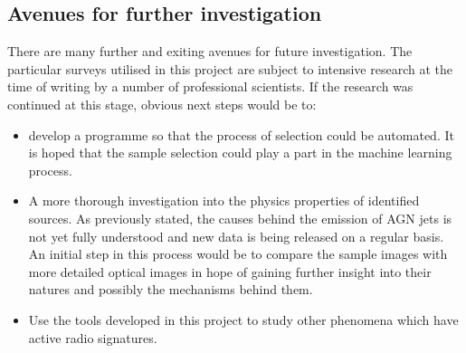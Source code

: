 \documentclass{article}
\begin{document}
\subsection{Avenues for further investigation}
There are many further and exiting avenues for future investigation. The particular surveys utilised in this project are subject to intensive research at the time of writing by a number of professional scientists. If the research was continued at this stage, obvious next steps would be to:
\begin{itemize}
    \item develop a programme so that the process of selection could be automated. It is hoped that the sample selection could play a part in the machine learning process.
    \item A more thorough investigation into the physics properties of identified sources. As previously stated, the causes behind the emission of AGN jets is not yet fully understood and new data is being released on a regular basis. An initial step in this process would be to compare the sample images with more detailed optical images in hope of gaining further insight into their natures and possibly the mechanisms behind them.
    \item Use the tools developed in this project to study other phenomena which have active radio signatures.
\end{itemize}
\newpage



\end{document}
